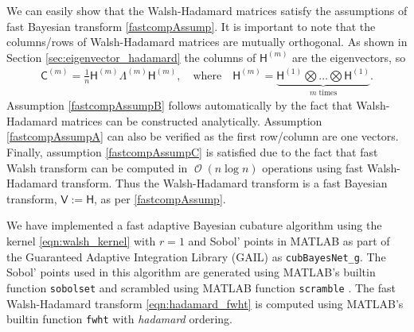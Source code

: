 \documentclass{iitthesis}          %
\DeclareMathOperator{\Order}{{\mathcal O}}
\newcommand{\mC}{\mathsf{C}}
\newcommand{\mH}{\mathsf{H}}
\newcommand{\mLambda}{\mathsf{\Lambda}}
\newcommand{\mV}{\mathsf{V}}
\newcommand{\code}[1]{\texttt{#1}}
\newcommand{\JRNote}[1]{{\textcolor{green}{JR: #1}}}
\begin{document}
We can easily show that the Walsh-Hadamard matrices satisfy the assumptions of fast Bayesian transform \eqref{fastcompAssump}. It is important to note that the columns/rows of Walsh-Hadamard matrices are mutually orthogonal. As shown in Section \ref{sec:eigenvector_hadamard} the columns of $\mH^{({m})}$ are the eigenvectors, so
\begin{align}
\label{eqn:hadamard_fwht}
\mC^{(m)} = \frac{1}{n} \mH^{(m)} \mLambda^{(m)} \mH^{(m)}, \quad \text{where} \quad \mH^{({m})} = \underbrace{ \mH^{(1)} \bigotimes \ldots \bigotimes \mH^{(1)} }_{m \; \text{times}}.
\end{align}
Assumption \eqref{fastcompAssumpB} follows automatically by the fact that Walsh-Hadamard matrices can be constructed analytically. Assumption \eqref{fastcompAssumpA} can also be verified as the first row/column are one vectors. Finally, assumption \eqref{fastcompAssumpC} is satisfied due to the fact that fast Walsh transform can be computed in $\Order({n \log n})$ operations using fast Walsh-Hadamard transform.
Thus the Walsh-Hadamard transform is a fast Bayesian transform, $\mV := \mH$, as per \eqref{fastcompAssump}.

We have implemented a fast adaptive Bayesian cubature algorithm using the kernel \eqref{eqn:walsh_kernel} with $r=1$ and Sobol' points \cite{BraFox88} in MATLAB as part of the Guaranteed Adaptive Integration Library (GAIL) \cite{ChoEtal17b} as \allowbreak \code{cubBayesNet\_g}. The Sobol' points used in this algorithm are generated using MATLAB's builtin function \code{sobolset} and scrambled using MATLAB function \code{scramble} \cite{HonHic00a}. The fast Walsh-Hadamard transform \eqref{eqn:hadamard_fwht} is computed using MATLAB's builtin function \code{fwht} with \emph{hadamard} ordering. 
\end{document}
